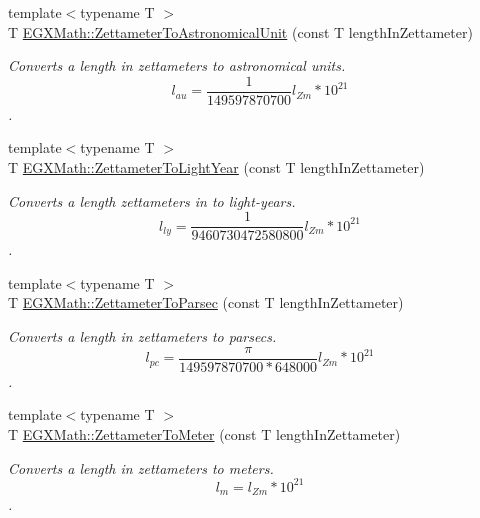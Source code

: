 \begin{DoxyCompactItemize}
\item 
{\footnotesize template$<$typename T $>$ }\\T \mbox{\hyperlink{group___e_g_x_math-_conversions-_length_conversions-_s_i-_zettameter-_astronomical_ga11b503418631f04db17ad979cef5403a}{E\+G\+X\+Math\+::\+Zettameter\+To\+Astronomical\+Unit}} (const T length\+In\+Zettameter)
\begin{DoxyCompactList}\small\item\em Converts a length in zettameters to astronomical units. \[ l_{au}= \frac{1}{149597870700} l_{Zm} * 10^{21} \]. \end{DoxyCompactList}\item 
{\footnotesize template$<$typename T $>$ }\\T \mbox{\hyperlink{group___e_g_x_math-_conversions-_length_conversions-_s_i-_zettameter-_astronomical_gacc76b416d7b6b3c4bd30cf8c5e924daf}{E\+G\+X\+Math\+::\+Zettameter\+To\+Light\+Year}} (const T length\+In\+Zettameter)
\begin{DoxyCompactList}\small\item\em Converts a length zettameters in to light-\/years. \[ l_{ly}= \frac{1}{9460730472580800} l_{Zm} * 10^{21} \]. \end{DoxyCompactList}\item 
{\footnotesize template$<$typename T $>$ }\\T \mbox{\hyperlink{group___e_g_x_math-_conversions-_length_conversions-_s_i-_zettameter-_astronomical_ga7924b0bc32c99624e84dcfb09806f730}{E\+G\+X\+Math\+::\+Zettameter\+To\+Parsec}} (const T length\+In\+Zettameter)
\begin{DoxyCompactList}\small\item\em Converts a length in zettameters to parsecs. \[ l_{pc}=\frac{\pi}{149597870700 * 648000} l_{Zm} * 10^{21} \]. \end{DoxyCompactList}\item 
{\footnotesize template$<$typename T $>$ }\\T \mbox{\hyperlink{group___e_g_x_math-_conversions-_length_conversions-_s_i-_zettameter-_s_i_ga4965fffbfd10b795231942d8de4e1f2d}{E\+G\+X\+Math\+::\+Zettameter\+To\+Meter}} (const T length\+In\+Zettameter)
\begin{DoxyCompactList}\small\item\em Converts a length in zettameters to meters. \[ l_{m}=l_{Zm} * 10^{21} \]. \end{DoxyCompactList}\item 

\end{DoxyCompactItemize}

